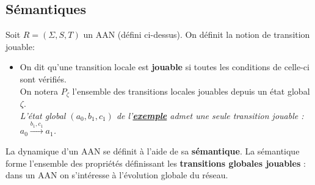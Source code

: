 \documentclass[12pt,a4paper]{article}
\begin{document}
\subsection{Sémantiques}
\hypertarget{semantiques}{Soit $R = (\Sigma,S,T)$ un AAN (défini ci-dessus). On définit la notion de transition jouable:}
\begin{itemize}
	\item On dit qu'une transition locale est \textbf{jouable} si toutes les conditions de celle-ci sont vérifiés.\\
	On notera $P_{\zeta}$ l'ensemble des transitions locales jouables depuis un état global $\zeta$.\\
	\emph{L'état global $(a_0,b_1,c_1)$ de l'\hyperlink{exemple}{\textbf{exemple}} admet une seule transition jouable : $a_0\xrightarrow{b_1,c_1} a_1$.}
\end{itemize}
La dynamique d'un AAN se définit à l'aide de sa \textbf{sémantique}. La sémantique forme l'ensemble des propriétés définissant les \textbf{transitions globales jouables} : dans un AAN on s'intéresse à l'évolution globale du réseau.
\end{document}
